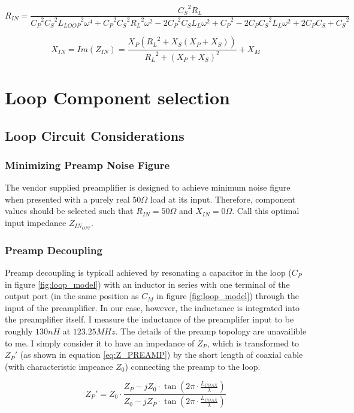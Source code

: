 \begin{equation} \label{eq:R_IN}
    R_{IN}=\frac{{C_S}^2 R_{L}}{{C_P}^2 {C_S}^2 {L_{LOOP}}^2 \omega^4 + {C_P}^2 {C_S}^2 {R_{L}}^2
    \omega^2 - 2 {C_P}^2 C_S L_{L} \omega^2 + {C_P}^2 - 2 C_P {C_S}^2 L_{L} \omega^2 + 2 C_P C_S + {C_S}^2}
\end{equation}

\begin{equation} \label{eq:X_IN}
    X_{IN}= Im(Z_{IN}) = \frac{X_P ({R_L}^2 + X_S(X_P+X_S))}{{R_L}^2+(X_P+X_S)^2}+X_M
\end{equation}

\section{Loop Component selection}

\subsection{Loop Circuit Considerations}
\subsubsection{Minimizing Preamp Noise Figure}
The vendor supplied preamplifier is designed to achieve minimum noise figure when presented with a purely real
$50\Omega$ load at its input. Therefore, component values should be selected such that $R_{IN}=50\Omega$ and
$X_{IN}=0\Omega$. Call this optimal input impedance $Z_{IN_{OPT}}$.

\subsubsection{Preamp Decoupling}
Preamp decoupling is typicall achieved by resonating a capacitor in the loop ($C_P$ in figure \ref{fig:loop_model}) with
an inductor in series with one terminal of the output port (in the same position as $C_M$ in figure
\ref{fig:loop_model}) through the input of the preamplifier. In our case, however, the inductance is integrated into the
preamplifier itself. I measure the inductance of the preamplifer input to be roughly $130nH$ at $123.25 MHz$. The
details of the preamp topology are unavailible to me. I simply consider it to have an impedance of $Z_P$, which
is transformed to ${Z_P}'$ (as shown in equation \ref{eq:Z_PREAMP}) by the short length of coaxial cable (with
characteristic impeance $Z_0$) connecting the preamp to the loop.

\begin{equation} \label{eq:Z_PREAMP}
    {Z_P}'=Z_0 \cdot \frac{Z_P-j Z_0 \cdot \tan(2\pi\cdot\frac{L_{COAX}}{\lambda})}{Z_0 - j Z_P \cdot
    \tan(2\pi\cdot\frac{L_{COAX}}{\lambda})}
\end{equation}

